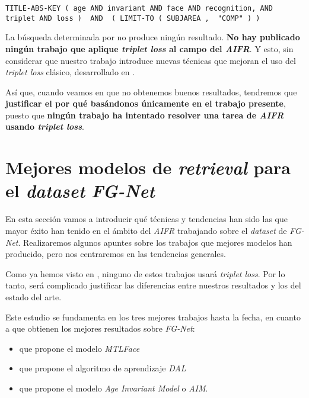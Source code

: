 \begin{lstlisting}[caption=Keywords usandos para la búsqueda de trabajos que combinen \textit{AIFR} y \textit{triplet loss} en \textit{SCOPUS}, label=code:scopus_search_especifico, captionpos=b]
    TITLE-ABS-KEY ( age AND invariant AND face AND recognition, AND triplet AND loss )  AND  ( LIMIT-TO ( SUBJAREA ,  "COMP" ) )
\end{lstlisting}

La búsqueda determinada por  no produce ningún resultado. \textbf{No hay publicado ningún trabajo que aplique \textit{triplet loss} al campo del \textit{AIFR}}. Y esto, sin considerar que nuestro trabajo introduce nuevas técnicas que mejoran el uso del \textit{triplet loss} clásico, desarrollado en .

Así que, cuando veamos en  que no obtenemos buenos resultados, tendremos que \textbf{justificar el por qué basándonos únicamente en el trabajo presente}, puesto que \textbf{ningún trabajo ha intentado resolver una tarea de \textit{AIFR} usando \textit{triplet loss}}.

\section{Mejores modelos de \textit{retrieval} para el \textit{dataset} \textit{FG-Net}}

En esta sección vamos a introducir qué técnicas y tendencias han sido las que mayor éxito han tenido en el ámbito del \textit{AIFR} trabajando sobre el \textit{dataset} de \textit{FG-Net}. Realizaremos algunos apuntes sobre los trabajos que mejores modelos han producido, pero nos centraremos en las tendencias generales.

Como ya hemos visto en , ninguno de estos trabajos usará \textit{triplet loss}. Por lo tanto, será complicado justificar las diferencias entre nuestros resultados y los del estado del arte.

Este estudio se fundamenta en los tres mejores trabajos hasta la fecha, en cuanto a que obtienen los mejores resultados sobre \textit{FG-Net}:

\begin{itemize}
    \item {} \cite{informatica:best_fgnet_model} que propone el modelo \textit{MTLFace}
    \item {} \cite{informatica:dal} que propone el algoritmo de aprendizaje \textit{DAL}
    \item {} \cite{informatica:aim} que propone el modelo \textit{Age Invariant Model} o \textit{AIM}.
\end{itemize}

